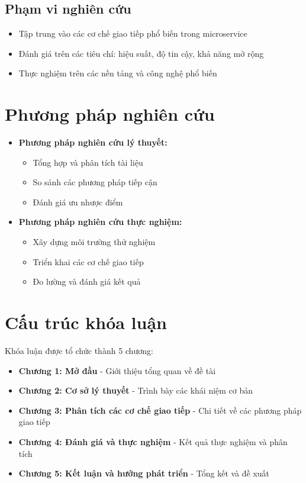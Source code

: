\subsection{Phạm vi nghiên cứu}
\begin{itemize}
    \item Tập trung vào các cơ chế giao tiếp phổ biến trong microservice
    \item Đánh giá trên các tiêu chí: hiệu suất, độ tin cậy, khả năng mở rộng
    \item Thực nghiệm trên các nền tảng và công nghệ phổ biến
\end{itemize}

\section{Phương pháp nghiên cứu}
\begin{itemize}
    \item \textbf{Phương pháp nghiên cứu lý thuyết:}
    \begin{itemize}
        \item Tổng hợp và phân tích tài liệu
        \item So sánh các phương pháp tiếp cận
        \item Đánh giá ưu nhược điểm
    \end{itemize}
    
    \item \textbf{Phương pháp nghiên cứu thực nghiệm:}
    \begin{itemize}
        \item Xây dựng môi trường thử nghiệm
        \item Triển khai các cơ chế giao tiếp
        \item Đo lường và đánh giá kết quả
    \end{itemize}
\end{itemize}

\section{Cấu trúc khóa luận}
Khóa luận được tổ chức thành 5 chương:

\begin{itemize}
    \item \textbf{Chương 1: Mở đầu} - Giới thiệu tổng quan về đề tài
    \item \textbf{Chương 2: Cơ sở lý thuyết} - Trình bày các khái niệm cơ bản
    \item \textbf{Chương 3: Phân tích các cơ chế giao tiếp} - Chi tiết về các phương pháp giao tiếp
    \item \textbf{Chương 4: Đánh giá và thực nghiệm} - Kết quả thực nghiệm và phân tích
    \item \textbf{Chương 5: Kết luận và hướng phát triển} - Tổng kết và đề xuất
\end{itemize} 